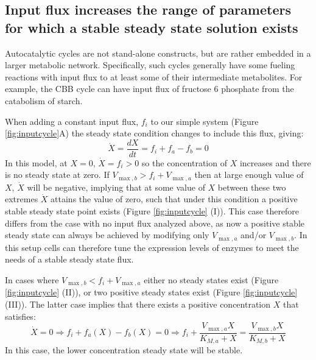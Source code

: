 \documentclass[a4page,notitlepage]{article}
\begin{document}
\subsection{Input flux increases the range of parameters for which a stable steady state solution exists}
    Autocatalytic cycles are not stand-alone constructs, but are rather embedded in a larger metabolic network.
    Specifically, such cycles generally have some fueling reactions with input flux to at least some of their intermediate metabolites.
    For example, the CBB cycle can have input flux of fructose 6 phosphate from the catabolism of starch.

    When adding a constant input flux, $f_i$ to our simple system (Figure \ref{fig:inputcycle}A) the steady state condition changes to include this flux, giving:
    \begin{equation*}
      \dot X = \frac{dX}{dt} = f_i + f_a - f_b = 0
    \end{equation*}
    In this model, at $X=0$, $\dot X=f_i>0$ so the concentration of $X$ increases and there is no steady state at zero.
    If $V_{\max,b}>f_i+V_{\max,a}$ then at large enough value of $X$, $\dot X$ will be negative, implying that at some value of $X$ between these two extremes $\dot{X}$ attains the value of zero, such that under this condition a positive stable steady state point exists (Figure \ref{fig:inputcycle} (I)).
    This case therefore differs from the case with no input flux analyzed above, as now a positive stable steady state can always be achieved by modifying only $V_{\max,a}$ and/or $V_{\max,b}$.
    In this setup cells can therefore tune the expression levels of enzymes to meet the needs of a stable steady state flux.

    In cases where $V_{\max,b}<f_i+V_{\max,a}$ either no steady states exist (Figure \ref{fig:inputcycle} (II)), or two positive steady states exist (Figure \ref{fig:inputcycle} (III)).
    The latter case implies that there exists a positive concentration $X$ that satisfies:
    \begin{equation*}
        \dot X = 0 \Rightarrow f_i + f_a(X) - f_b(X) = 0 \Rightarrow f_i+\frac{V_{\max,a}X}{K_{M,a}+X} = \frac{V_{\max,b}X}{K_{M,b}+X}
    \end{equation*}
  In this case, the lower concentration steady state will be stable.
\end{document}
